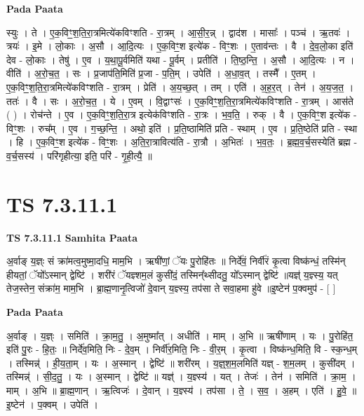 \documentclass[17pt]{extarticle}
\begin{document}
\textbf{Pada Paata} \newline

स्युः । ते । ए॒क॒विꣳ॒॒श॒ति॒रा॒त्रमित्ये॑कविꣳशति - रा॒त्रम् । आ॒सी॒र॒न्न् । द्वाद॑श । मासाः᳚ । पञ्च॑ । ऋ॒तवः॑ । त्रयः॑ । इ॒मे । लो॒काः । अ॒सौ । आ॒दि॒त्यः । ए॒क॒विꣳ॒॒श इत्ये॑क - विꣳ॒॒शः । ए॒ताव॑न्तः । वै । दे॒व॒लो॒का इति॑ देव - लो॒काः । तेषु॑ । ए॒व । य॒था॒पू॒र्वमिति॑ यथा - पू॒र्वम् । प्रतीति॑ । ति॒ष्ठ॒न्ति॒ । अ॒सौ । आ॒दि॒त्यः । न । वीति॑ । अ॒रो॒च॒त॒ । सः । प्र॒जाप॑ति॒मिति॑ प्र॒जा - प॒ति॒म् । उपेति॑ । अ॒धा॒व॒त् । तस्मै᳚ । ए॒तम् । ए॒क॒विꣳ॒॒श॒ति॒रा॒त्रमित्ये॑कविꣳशति - रा॒त्रम् । प्रेति॑ । अ॒य॒च्छ॒त् । तम् । एति॑ । अ॒ह॒र॒त् । तेन॑ । अ॒य॒ज॒त॒ । ततः॑ । वै । सः । अ॒रो॒च॒त॒ । ये । ए॒वम् । वि॒द्वाꣳसः॑ । ए॒क॒विꣳ॒॒श॒ति॒रा॒त्रमित्ये॑कविꣳशति - रा॒त्रम् । आस॑ते ( ) । रोच॑न्ते । ए॒व । ए॒क॒विꣳ॒॒श॒ति॒रा॒त्र इत्येक॑विꣳशति - रा॒त्रः । भ॒व॒ति॒ । रुक् । वै । ए॒क॒विꣳ॒॒श इत्ये॑क - विꣳ॒॒शः । रुच᳚म् । ए॒व । ग॒च्छ॒न्ति॒ । अथो॒ इति॑ । प्र॒ति॒ष्ठामिति॑ प्रति - स्थाम् । ए॒व । प्र॒ति॒ष्ठेति॑ प्रति - स्था । हि । ए॒क॒विꣳ॒॒श इत्ये॑क - विꣳ॒॒शः । अ॒ति॒रा॒त्रावित्य॑ति - रा॒त्रौ । अ॒भितः॑ । भ॒व॒तः॒ । ब्र॒ह्म॒व॒र्च॒सस्येति॑ ब्रह्म - व॒र्च॒सस्य॑ । परि॑गृहीत्या॒ इति॒ परि॑ - गृ॒ही॒त्यै॒ ॥  \newline





\section{ TS 7.3.11.1 }

\textbf{TS 7.3.11.1 } \newline
\textbf{Samhita Paata} \newline

अ॒र्वाङ् य॒ज्ञ्ः सं क्रा॑मत्व॒मुष्मा॒दधि॒ माम॒भि । ऋषी॑णां॒ ॅयः पु॒रोहि॑तः ॥ निर्दे॑वं॒ निर्वी॑रं कृ॒त्वा विष्क॑न्धं॒ तस्मि॑न् हीयतां॒ ॅयो᳚ऽस्मान् द्वेष्टि॑ । शरी॑रं ॅयज्ञ्शम॒लं कुसी॑दं॒ तस्मिन्᳚थ्सीदतु॒ यो᳚ऽस्मान् द्वेष्टि॑ ॥यज्ञ्॑ य॒ज्ञ्स्य॒ यत् तेज॒स्तेन॒ संक्रा॑म॒ माम॒भि । ब्रा॒ह्म॒णानृ॒त्विजो॑ दे॒वान् य॒ज्ञ्स्य॒ तप॑सा ते सवा॒हमा हु॑वे ॥इ॒ष्टेन॑ प॒क्वमुप॑ - [  ] \newline

\textbf{Pada Paata} \newline

अ॒र्वाङ् । य॒ज्ञ्ः । समिति॑ । क्रा॒म॒तु॒ । अ॒मुष्मा᳚त् । अधीति॑ । माम् । अ॒भि ॥ ऋषी॑णाम् । यः । पु॒रोहि॑त॒ इति॑ पु॒रः - हि॒तः॒ ॥ निर्दे॑व॒मिति॒ निः - दे॒व॒म् । निर्वी॑र॒मिति॒ निः - वी॒र॒म् । कृ॒त्वा । विष्क॑न्ध॒मिति॒ वि - स्क॒न्ध॒म् । तस्मिन्न्॑ । ही॒य॒ता॒म् । यः । अ॒स्मान् । द्वेष्टि॑ ॥ शरी॑रम् । य॒ज्ञ्॒श॒म॒लमिति॑ यज्ञ् - श॒म॒लम् । कुसी॑दम् । तस्मिन्न्॑ । सी॒द॒तु॒ । यः । अ॒स्मान् । द्वेष्टि॑ ॥ यज्ञ्॑ । य॒ज्ञ्स्य॑ । यत् । तेजः॑ । तेन॑ । समिति॑ । क्रा॒म॒ । माम् । अ॒भि ॥ ब्रा॒ह्म॒णान् । ऋ॒त्विजः॑ । दे॒वान् । य॒ज्ञ्स्य॑ । तप॑सा । ते॒ । स॒व॒ । अ॒हम् । एति॑ । हु॒वे॒ ॥ इ॒ष्टेन॑ । प॒क्वम् । उपेति॑ ।  \newline
\end{document}
